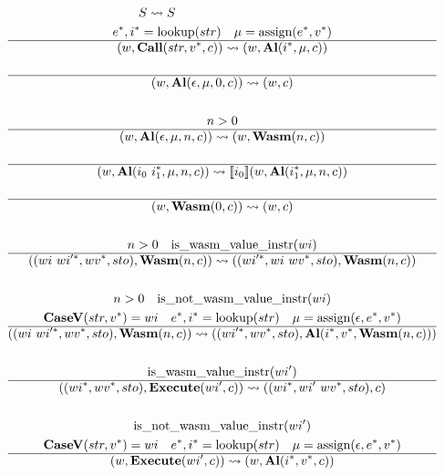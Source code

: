 \begin{gather*}
\newline \\
  S \leadsto S
%
\newline \\
  \seq e, \seq i = \lookup(str) \quad \mu = \assign(\seq e, \seq v) \\
  \hline
  (w, \call (str, \seq v, c)) \leadsto (w, \al (\seq i, \mu, c)) \\
%
\newline \\
  \hline
  (w, \al (\epsilon, \mu, 0, c)) \leadsto (w, c) \\
%
\newline \\
  n > 0 \\
  \hline
  (w, \al (\epsilon, \mu, n, c)) \leadsto (w, \wasm (n, c)) \\
%
\newline \\
  \hline
  (w, \al (i_0 ~ \seq{i_1}, \mu, n, c)) \leadsto \sem{i_0}(w, \al (\seq{i_1}, \mu, n, c)) \\
%
\newline \\
  \hline
  (w, \wasm (0, c)) \leadsto (w, c) \\
%
\newline \\
  n > 0 \quad \iswasmvalueinstr(wi) \\
  \hline
  ((wi ~ \seq{wi'}, \seq{wv}, sto), \wasm (n, c))
  \leadsto
  ((\seq{wi'}, wi ~ \seq{wv}, sto), \wasm (n, c)) \\
%
\newline \\
  n > 0 \quad \isnotwasmvalueinstr(wi) \\
  \casev (str, \seq v) = wi \quad
  \seq e, \seq i = \lookup(str) \quad
  \mu = \assign(\epsilon, \seq e, \seq v) \\
  \hline
  ((wi ~ \seq{wi'}, \seq{wv}, sto), \wasm (n, c))
  \leadsto
  ((\seq{wi'}, \seq{wv}, sto), \al (\seq i, \seq v, \wasm (n, c))) \\
%
\newline \\
  \iswasmvalueinstr(wi') \\
  \hline
  ((\seq{wi}, \seq{wv}, sto), \exe (wi', c))
  \leadsto
  ((\seq{wi}, wi' ~ \seq{wv}, sto), c) \\
%
\newline \\
  \isnotwasmvalueinstr(wi') \\
  \casev (str, \seq v) = wi \quad
  \seq e, \seq i = \lookup(str) \quad
  \mu = \assign(\epsilon, \seq e, \seq v) \\
  \hline
  (w, \exe (wi', c)) \leadsto (w, \al (\seq i, \seq v, c)) \\
\end{gather*}





